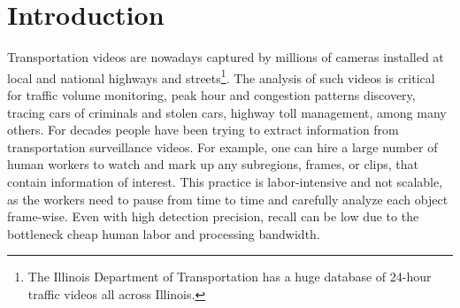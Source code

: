 \section{Introduction}
\label{sec:scene-intro}

Transportation videos are nowadays captured by millions of cameras installed at local and national highways and streets\footnote{The Illinois Department of Transportation has a huge database of 24-hour traffic videos all across Illinois.}.
The analysis of such videos is critical for traffic volume monitoring, peak hour and congestion patterns discovery, tracing cars of criminals and stolen cars, highway toll management, among many others.
For decades people have been trying to extract information from transportation surveillance videos.
For example, one can hire a large number of human workers to watch and mark up any subregions, frames, or clips, that contain information of interest.
This practice is labor-intensive and not scalable,
as the workers need to pause from time to time and carefully analyze each object frame-wise.
Even with high detection precision, recall can be low due to the bottleneck cheap human labor and processing bandwidth.



